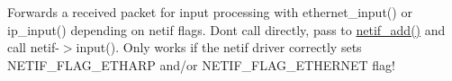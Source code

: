 Forwards a received packet for input processing with ethernet\+\_\+input() or ip\+\_\+input() depending on netif flags. Don\textquotesingle{}t call directly, pass to \hyperlink{group__netif_gabde72af134ae7047a46ad7719d2a1ee9}{netif\+\_\+add()} and call netif-\/$>$input(). Only works if the netif driver correctly sets N\+E\+T\+I\+F\+\_\+\+F\+L\+A\+G\+\_\+\+E\+T\+H\+A\+RP and/or N\+E\+T\+I\+F\+\_\+\+F\+L\+A\+G\+\_\+\+E\+T\+H\+E\+R\+N\+ET flag! 